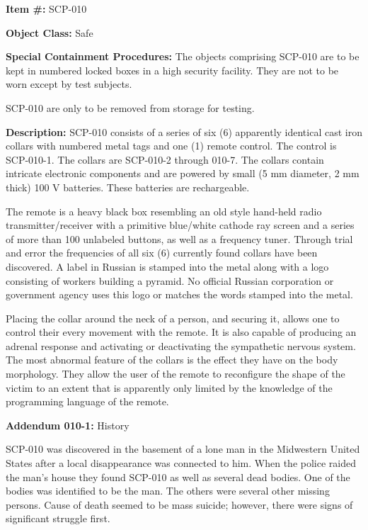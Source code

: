 \textbf{Item \#:} SCP-010

\textbf{Object Class:} Safe

\textbf{Special Containment Procedures:} The objects comprising SCP-010 are to be kept in numbered locked boxes in a high security facility. They are not to be worn except by test subjects.

SCP-010 are only to be removed from storage for testing.

\textbf{Description:} SCP-010 consists of a series of six (6) apparently identical cast iron collars with numbered metal tags and one (1) remote control. The control is SCP-010-1. The collars are SCP-010-2 through 010-7. The collars contain intricate electronic components and are powered by small (5 mm diameter, 2 mm thick) 100 V batteries. These batteries are rechargeable.

The remote is a heavy black box resembling an old style hand-held radio transmitter/receiver with a primitive blue/white cathode ray screen and a series of more than 100 unlabeled buttons, as well as a frequency tuner. Through trial and error the frequencies of all six (6) currently found collars have been discovered. A label in Russian is stamped into the metal along with a logo consisting of workers building a pyramid. No official Russian corporation or government agency uses this logo or matches the words stamped into the metal.

Placing the collar around the neck of a person, and securing it, allows one to control their every movement with the remote. It is also capable of producing an adrenal response and activating or deactivating the sympathetic nervous system. The most abnormal feature of the collars is the effect they have on the body morphology. They allow the user of the remote to reconfigure the shape of the victim to an extent that is apparently only limited by the knowledge of the programming language of the remote.

\textbf{Addendum 010-1:} History

SCP-010 was discovered in the basement of a lone man in the Midwestern United States after a local disappearance was connected to him. When the police raided the man's house they found SCP-010 as well as several dead bodies. One of the bodies was identified to be the man. The others were several other missing persons. Cause of death seemed to be mass suicide; however, there were signs of significant struggle first.

